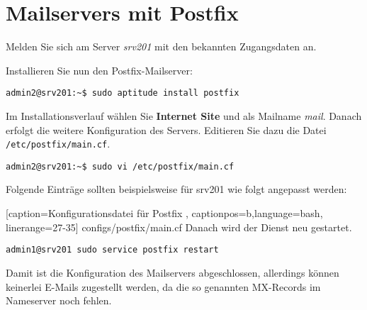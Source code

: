 \section{Mailservers mit Postfix}

Melden Sie sich am Server \textit{srv201} mit den bekannten Zugangsdaten an. 

Installieren Sie nun den Postfix-Mailserver:
\begin{lstlisting}
admin2@srv201:~$ sudo aptitude install postfix
\end{lstlisting}
Im Installationsverlauf wählen Sie \textbf{Internet Site} und als Mailname
\textit{mail}. Danach erfolgt die weitere Konfiguration des Servers. Editieren
Sie dazu die Datei \texttt{/etc/postfix/main.cf}.
\begin{lstlisting}
admin2@srv201:~$ sudo vi /etc/postfix/main.cf
\end{lstlisting}
Folgende Einträge sollten beispielsweise für srv201 wie folgt angepasst werden:

    [caption={Konfigurationsdatei für Postfix}
       \label{lst:postifx-main},
       captionpos=b,language=bash, linerange=27-35]
{configs/postfix/main.cf}
Danach wird der Dienst neu gestartet.
\begin{lstlisting}
admin1@srv201 sudo service postfix restart
\end{lstlisting}
Damit ist die Konfiguration des Mailservers abgeschlossen, allerdings können keinerlei E-Mails zugestellt werden, da die so genannten MX-Records im Nameserver noch fehlen.

